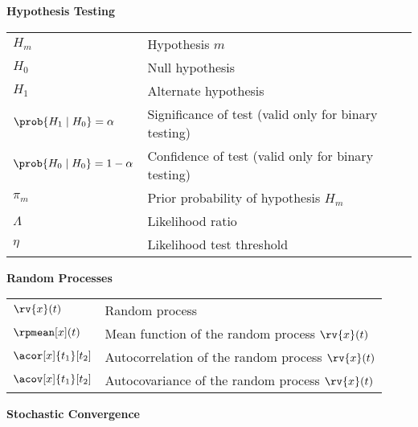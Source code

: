 \begin{center}
    \textbf{Hypothesis Testing}
\end{center}

\begin{table}[H]
    \centering
    \begin{tabular}{p{}p{}}
        $H_{m}$  & Hypothesis $m$\\
        $H_{0}$ & Null hypothesis\\
        $H_{1}$ & Alternate hypothesis\\
        $\prob{H_{1}\mid H_{0}} = \alpha$ & Significance of test (valid only for binary testing)\\
        $\prob{H_{0}\mid H_{0}} = 1 - \alpha$ & Confidence of test (valid only for binary testing)\\
        $\pi_{m}$ & Prior probability of hypothesis $H_{m}$\\
        $\Lambda$ & Likelihood ratio\\
        $\eta$ & Likelihood test threshold
    \end{tabular}
\end{table}
%
\begin{center}
    \textbf{Random Processes}
\end{center}
\begin{table}[h]
    \centering
    \begin{tabular}{p{}p{}}
        $\rv{x}(t)$ & Random process\\
        $\rpmean[x](t)$   & Mean function of the random process $\rv{x}(t)$\\
        $\acor[x]{t_{1}}[t_{2}]$ & Autocorrelation of the random process $\rv{x}(t)$\\
        $\acov[x]{t_{1}}[t_{2}]$ & Autocovariance of the random process $\rv{x}(t)$
    \end{tabular}
\end{table}
\begin{center}
    \textbf{Stochastic Convergence}
\end{center}
